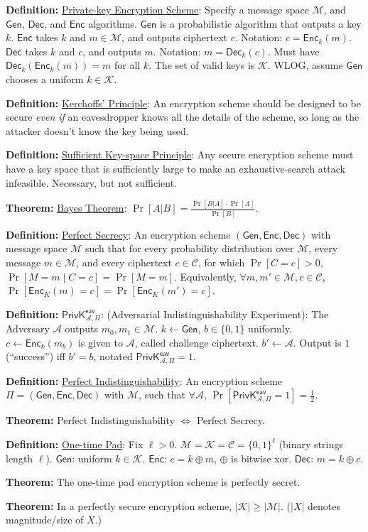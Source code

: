 \documentclass[12pt]{article}
\newcommand{\AAA}{\mathcal{A}}
\newcommand{\CCC}{\mathcal{C}}
\newcommand{\KKK}{\mathcal{K}}
\newcommand{\MMM}{\mathcal{M}}
\newcommand{\defn}[1]{{\bf Definition:} \underline{#1}}
\newcommand{\thm}[1]{{\bf Theorem:} \underline{#1}}
\newcommand{\Enc}{\mathsf{Enc}}
\newcommand{\Dec}{\mathsf{Dec}}
\newcommand{\Gen}{\mathsf{Gen}}
\newcommand{\GenEncDec}{(\Gen,\Enc,\Dec)}
\newcommand{\ExptEavArgs}[2]{\mathsf{PrivK}^{\mathsf{eav}}_{#1,#2}}
\newcommand{\ExptEav}{\ExptEavArgs{\AAA}{\Pi}}
\newcommand{\xor}{\oplus}
\newcommand{\from}{\leftarrow}
\begin{document}
\scriptsize
\begin{multicols}{3}

\defn{Private-key Encryption Scheme}: Specify a message space $\MMM$, and $\Gen$, $\Dec$, and $\Enc$ algorithms. $\Gen$ is a probabilistic algorithm that outputs a key $k$. $\Enc$ takes $k$ and $m\in\MMM$, and outputs ciphertext $c$. Notation: $c=\Enc_k(m)$. $\Dec$ takes $k$ and $c$, and outputs $m$. Notation: $m=\Dec_k(c)$. Must have $\Dec_k(\Enc_k(m))=m$ for all $k$. The set of valid keys is $\KKK$. WLOG, assume $\Gen$ chooses a uniform $k\in\KKK$.

\defn{Kerchoffs' Principle}: An encryption scheme should be designed to be secure {\it even if} an eavesdropper knows all the details of the scheme, so long as the attacker doesn't know the key being used. 

\defn{Sufficient Key-space Principle}: Any secure encryption scheme must have a key space that is sufficiently large to make an exhaustive-search attack infeasible. Necessary, but not sufficient.

\thm{Bayes Theorem}: $\Pr[A|B]=\frac{\Pr[B|A]\cdot\Pr[A]}{\Pr[B]}$.

\defn{Perfect Secrecy}: An encryption scheme $\GenEncDec$ with message space $\MMM$ such that for every probability distribution over $\MMM$, every message $m\in \MMM$, and every ciphertext $c\in\CCC$, for which $\Pr[C=c]>0$, $\Pr[M=m\mid C=c]=\Pr[M=m]$. Equivalently, $\forall m,m'\in\MMM,c\in\CCC$, $\Pr[\Enc_K(m)=c]=\Pr[\Enc_K(m')=c]$.

\defn{$\ExptEav$}: (Adversarial Indistinguishability Experiment): The Adversary $\AAA$ outputs $m_0,m_1\in\MMM$. $k\from\Gen$, $b\in\{0,1\}$ uniformly. $c\from\Enc_k(m_b)$ is given to $\AAA$, called challenge ciphertext. $b'\from\AAA$. Output is $1$ (``success'') iff $b'=b$, notated $\ExptEav=1$.

\defn{Perfect Indistinguishability}: An encryption scheme $\Pi=\GenEncDec$ with $\MMM$, such that $\forall\AAA$, $\Pr[\ExptEav=1]=\frac{1}{2}$.

\thm{}Perfect Indistinguishability $\Leftrightarrow$ Perfect Secrecy.

\defn{One-time Pad}: Fix $\ell>0$. $\MMM=\KKK=\CCC=\{0,1\}^\ell$ (binary strings length $\ell$). $\Gen$: uniform $k\in\KKK$. $\Enc$: $c=k\xor m$, $\xor$ is bitwise xor. $\Dec$: $m=k\xor c$.

\thm{}The one-time pad encryption scheme is perfectly secret.

\thm{}In a perfectly secure encryption scheme, $|\KKK|\geq|\MMM|$. ($|X|$ denotes magnitude/size of $X$.)


\end{multicols}
\end{document}
